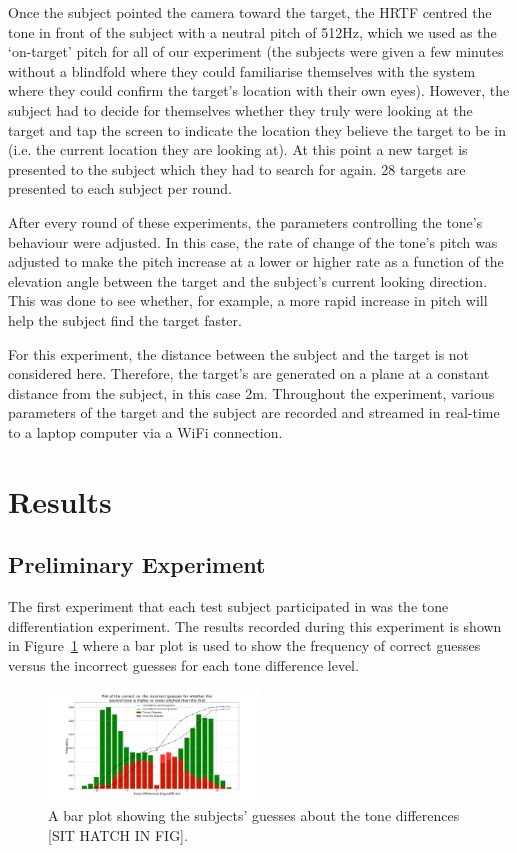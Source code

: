 \documentclass[format=sigconf, review=true, screen=true, anonymous=true]{acmart}
\begin{document}
Once the subject pointed the camera toward the target, the HRTF centred the tone in front of the subject with a neutral pitch of 512Hz, which we used as the `on-target' pitch for all of our experiment (the subjects were given a few minutes without a blindfold where they could familiarise themselves with the system where they could confirm the target's location with their own eyes). However, the subject had to decide for themselves whether they truly were looking at the target and tap the screen to indicate the location they believe the target to be in (i.e. the current location they are looking at). At this point a new target is presented to the subject which they had to search for again. 28 targets are presented to each subject per round. 

After every round of these experiments, the parameters controlling the tone's behaviour were adjusted. In this case, the rate of change of the tone's pitch was adjusted to make the pitch increase at a lower or higher rate as a function of the elevation angle between the target and the subject's current looking direction. This was done to see whether, for example, a more rapid increase in pitch will help the subject find the target faster. 

For this experiment, the distance between the subject and the target is not considered here. Therefore, the target's are generated on a plane at a constant distance from the subject, in this case 2m. Throughout the experiment, various parameters of the target and the subject are recorded and streamed in real-time to a laptop computer via a WiFi connection.

\section{Results}

\subsection{Preliminary Experiment}

The first experiment that each test subject participated in was the tone differentiation experiment. The results recorded during this experiment is shown in Figure~\ref{fig:tone-guesses} where a bar plot is used to show the frequency of correct guesses versus the incorrect guesses for each tone difference level. 

\begin{figure}
  \centering
  \includegraphics[width=0.5\textwidth]{figures/tone_guesses.png}
  \caption{A bar plot showing the subjects' guesses about the tone differences [SIT HATCH IN FIG].}
  \label{fig:tone-guesses}
\end{figure}
\end{document}
